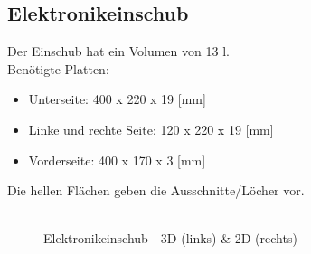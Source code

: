 \subsection{Elektronikeinschub}
Der Einschub hat ein Volumen von 13 l.\\
Benötigte Platten:
\begin{itemize}
	\item Unterseite: 400 x 220 x 19 [mm]
	\item Linke und rechte Seite: 120 x 220 x 19 [mm]
	\item Vorderseite: 400 x 170 x 3 [mm]
\end{itemize}
Die hellen Flächen geben die Ausschnitte/Löcher vor.\\ \\
\begin{figure} [H]
	\centering
	\quad
	\caption{Elektronikeinschub - 3D (links) \& 2D (rechts)}
	\label{fig:8.11.2}
\end{figure}


\newpage
